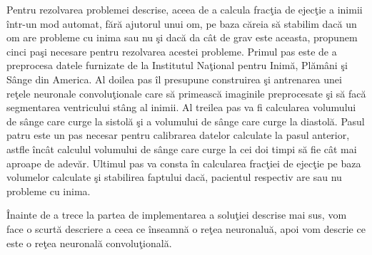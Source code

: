 Pentru rezolvarea problemei descrise, aceea de a calcula frac\c{t}ia de ejec\c{t}ie a inimii \^{i}ntr-un mod automat, f\u{a}r\u{a} ajutorul unui om, pe baza c\u{a}reia s\u{a} stabilim dac\u{a} un om are probleme cu inima sau nu \c{s}i dac\u{a} da c\^{a}t de grav este aceasta, propunem cinci pa\c{s}i necesare pentru rezolvarea acestei probleme. Primul pas este de a preprocesa datele furnizate de la Institutul Na\c{t}ional pentru Inim\u{a}, Pl\u{a}m\^{a}ni \c{s}i S\^{a}nge din America. Al doilea pas \^{i}l presupune construirea \c{s}i antrenarea unei re\c{t}ele neuronale convolu\c{t}ionale care s\u{a} primeasc\u{a} imaginile preprocesate \c{s}i s\u{a} fac\u{a} segmentarea ventricului st\^{a}ng al inimii. Al treilea pas va fi calcularea volumului de s\^{a}nge care curge la sistol\u{a} \c{s}i a volumului de s\^{a}nge care curge la diastol\u{a}. Pasul patru este un pas necesar pentru calibrarea datelor calculate la pasul anterior, astfle \^{i}nc\^{a}t calculul volumului de s\^{a}nge care curge la cei doi timpi s\u{a} fie c\^{a}t mai aproape de adev\u{a}r. Ultimul pas va consta \^{i}n calcularea frac\c{t}iei de ejec\c{t}ie pe baza volumelor calculate \c{s}i stabilirea faptului dac\u{a}, pacientul respectiv are sau nu probleme cu inima. 

\par

\^{I}nainte de a trece la partea de implementarea a solu\c{t}iei descrise mai sus, vom face o scurt\u{a} descriere a ceea ce \^{i}nseamn\u{a} o re\c{t}ea neuronalu\u{a}, apoi vom descrie ce este o re\c{t}ea neuronal\u{a} convolu\c{t}ional\u{a}.